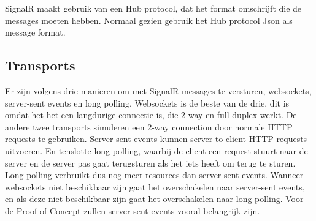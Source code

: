 SignalR maakt gebruik van een Hub protocol, dat het format omschrijft die de messages moeten hebben. Normaal gezien gebruik het Hub protocol Json als message format.

\subsection{Transports}
Er zijn volgens \textcite{PluralsightSignalR} drie manieren om met SignalR messages te versturen, websockets, server-sent events en long polling. Websockets is de beste van de drie, dit is omdat het het een langdurige connectie is, die 2-way en full-duplex werkt. De andere twee transports simuleren een 2-way connection door normale HTTP requests te gebruiken. Server-sent events kunnen server to client HTTP requests uitvoeren. En tenslotte long polling, waarbij de client een request stuurt naar de server en de server pas gaat terugsturen als het iets heeft om terug te sturen. Long polling verbruikt dus nog meer resources dan server-sent events. Wanneer websockets niet beschikbaar zijn gaat het overschakelen naar server-sent events, en als deze niet beschikbaar zijn gaat het overschakelen naar long polling.
Voor de Proof of Concept zullen server-sent events vooral belangrijk zijn. 